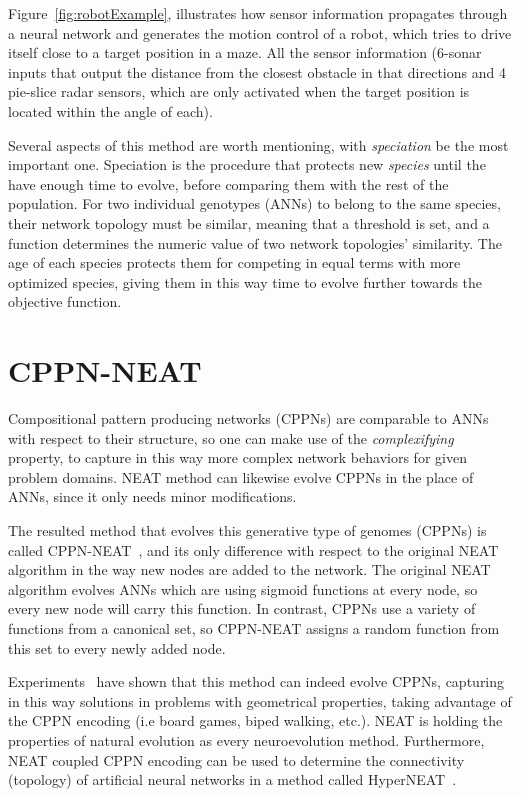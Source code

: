 Figure~\ref{fig:robotExample}, illustrates how sensor information propagates through a neural network and generates the motion control of a robot, which tries to drive itself close to a target position in a maze. All the sensor information (6-sonar inputs that output the distance from the closest obstacle in that directions and 4 pie-slice radar sensors, which are only activated when the target position is located within the angle of each).

Several aspects of this method are worth mentioning, with \emph{speciation} be the most important one. Speciation is the procedure that protects new \emph{species} until the have enough time to evolve, before comparing them with the rest of the population. For two individual genotypes (ANNs) to belong to the same species, their network topology must be similar, meaning that a threshold is set, and a function determines the numeric value of two network topologies' similarity. The age of each species protects them for competing in equal terms with more optimized species, giving them in this way time to evolve further towards the objective function.



\section{CPPN-NEAT}

Compositional pattern producing networks (CPPNs) are comparable to ANNs with respect to their structure, so one can make use of the \emph{complexifying} property, to capture in this way more complex network behaviors for given problem domains. NEAT method can likewise evolve CPPNs in the place of ANNs, since it only needs minor modifications. 

The resulted method that evolves this generative type of genomes (CPPNs) is called CPPN-NEAT~\citep{stanley2007compositional}, and its only difference with respect to the original NEAT algorithm in the way new nodes are added to the network. The original NEAT algorithm evolves ANNs which are using sigmoid functions at every node, so every new node will carry this function.
In contrast, CPPNs use a variety of functions from a canonical set, so CPPN-NEAT assigns a random function from this set to every newly added node. 

Experiments~\citep{stanley2007compositional} have shown that this method can indeed evolve CPPNs, capturing in this way solutions in problems with geometrical properties, taking advantage of the CPPN encoding (i.e board games, biped walking, etc.). NEAT is holding the properties of natural evolution as every neuroevolution method. Furthermore, NEAT coupled CPPN encoding can be used to determine the connectivity (topology) of artificial neural networks in  a method called HyperNEAT~\citep{stanley2009hypercube}.




